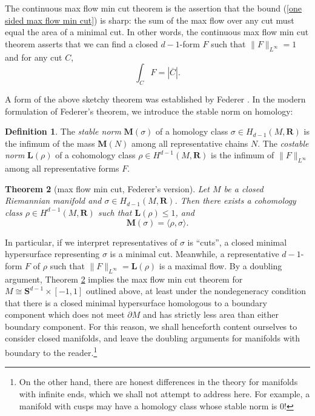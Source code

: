 \documentclass[reqno,11pt]{amsart}
\newcommand{\RR}{\mathbf{R}}
\newcommand{\Sph}{\mathbf S}
\newcommand{\Mass}{\mathbf M}
\newcommand{\Comass}{\mathbf L}
\newcommand{\dfn}[1]{\emph{#1}\index{#1}}
\newtheorem{theorem}{Theorem}[section]
\theoremstyle{definition}
\newtheorem{definition}[theorem]{Definition}
\numberwithin{equation}{section}
\begin{document}
The continuous max flow min cut theorem is the assertion that the bound (\ref{one sided max flow min cut}) is sharp: the sum of the max flow over any cut must equal the area of a minimal cut.
In other words, the continuous max flow min cut theorem asserts that we can find a closed $d - 1$-form $F$ such that $\|F\|_{L^\infty} = 1$ and for any cut $C$,
$$\int_C F = |\overline C|.$$

A form of the above sketchy theorem was established by Federer \cite[\S4.15]{Federer1974}.
In the modern formulation of Federer's theorem, we introduce the stable norm on homology:

\begin{definition}
The \dfn{stable norm} $\Mass(\sigma)$ of a homology class $\sigma \in H_{d - 1}(M, \RR)$ is the infimum of the mass $\Mass(N)$ among all representative chains $N$.
The \dfn{costable norm} $\Comass(\rho)$ of a cohomology class $\rho \in H^{d - 1}(M, \RR)$ is the infimum of $\|F\|_{L^\infty}$ among all representative forms $F$.
\end{definition}

\begin{theorem}[max flow min cut, Federer's version]\label{Federer}
Let $M$ be a closed Riemannian manifold and $\sigma \in H_{d - 1}(M, \RR)$.
Then there exists a cohomology class $\rho \in H^{d - 1}(M, \RR)$ such that $\Comass(\rho) \leq 1$, and 
$$\Mass(\sigma) = \langle \rho, \sigma\rangle.$$
\end{theorem}

In particular, if we interpret representatives of $\sigma$ is ``cuts'', a closed minimal hypersurface representing $\sigma$ is a minimal cut.
Meanwhile, a representative $d - 1$-form $F$ of $\rho$ such that $\|F\|_{L^\infty} = \Comass(\rho)$ is a maximal flow.
By a doubling argument, Theorem \ref{Federer} implies the max flow min cut theorem for $M \cong \Sph^{d - 1} \times [-1, 1]$ outlined above, at least under the nondegeneracy condition that there is a closed minimal hypersurface homologous to a boundary component which does not meet $\partial M$ and has strictly less area than either boundary component.
For this reason, we shall henceforth content ourselves to consider closed manifolds, and leave the doubling arguments for manifolds with boundary to the reader.\footnote{On the other hand, there are honest differences in the theory for manifolds with infinite ends, which we shall not attempt to address here. For example, a manifold with cusps may have a homology class whose stable norm is $0$!}
\end{document}
